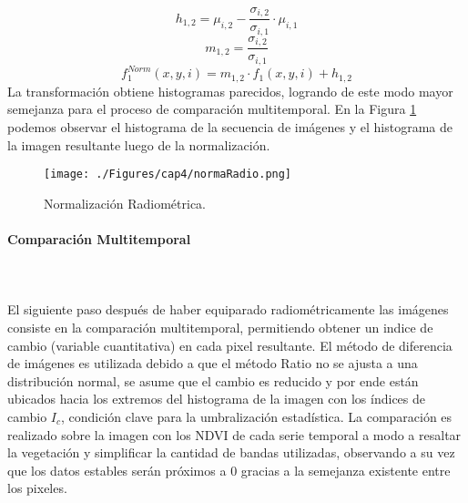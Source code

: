 			\begin{equation}
			h_{1,2}=\mu_{i,2}-\dfrac{\sigma_{i,2}}{\sigma_{i,1}}\cdot\mu_{i,1}
			\end{equation}
					\begin{equation}
					m_{1,2}=\dfrac{\sigma_{i,2}}{\sigma_{i,1}}
					\end{equation}
		\begin{equation}
				f_{1}^{Norm}(x,y,i)=m_{1,2}\cdot f_{1}(x,y,i)+h_{1,2}
		\end{equation}
	La transformaci\'on obtiene histogramas parecidos, logrando de este modo mayor semejanza para el proceso de comparaci\'on multitemporal. En la Figura \ref{fig:normRadio} podemos observar el histograma de la secuencia de im\'agenes y el histograma de la imagen resultante luego de la normalizaci\'on.
	
	\begin{figure}[H]
		\centering
		\texttt{[image: ./Figures/cap4/normaRadio.png]}
		\caption{Normalizaci\'on Radiom\'etrica.}
		\label{fig:normRadio}
	\end{figure}
	
	
\paragraph{Comparaci\'on Multitemporal}\mbox{}\\\mbox{}\\
El siguiente paso despu\'es de haber equiparado radiom\'etricamente las im\'agenes consiste en la comparaci\'on multitemporal, permitiendo obtener un indice de cambio (variable cuantitativa) en cada pixel resultante. El m\'etodo de diferencia de im\'agenes es utilizada debido a que el m\'etodo Ratio no se ajusta a una distribuci\'on normal, se asume que el cambio es reducido y por ende est\'an ubicados hacia los extremos del histograma de la imagen con los \'indices de cambio $ I_{c} $, condici\'on clave para la umbralizaci\'on estad\'istica. La comparaci\'on es realizado sobre la imagen con los NDVI de cada serie temporal a modo a resaltar la vegetaci\'on y simplificar la cantidad de bandas utilizadas, observando a su vez que los datos estables ser\'an pr\'oximos a $ 0 $ gracias a la semejanza existente entre los pixeles. 
